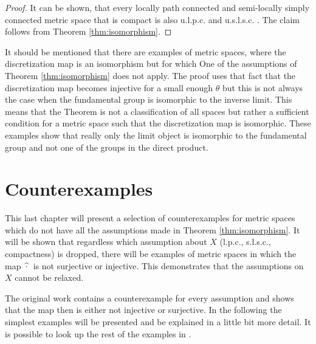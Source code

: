 \documentclass[a4paper, 11pt, twoside]{article}
\theoremstyle{break}
\theoremstyle{break}
\begin{document}
\begin{proof}
  It can be shown, that every locally path connected and semi-locally simply connected metric space that is compact is also u.l.p.c. and u.s.l.s.c. \cite[Lemma 5.14.4]{sakai2013geometric}. The claim follows from Theorem \ref{thm:isomorphism}.
\end{proof}

It should be mentioned that there are examples of metric spaces, where the discretization map is an isomorphism but for which One of the assumptions of Theorem \ref{thm:isomorphism} does not apply.
The proof uses that fact that the discretization map becomes injective for a small enough $\theta$ but this is not always the case when the fundamental group is isomorphic to the inverse limit.
This means that the Theorem is not a classification of all spaces but rather a sufficient condition for a metric space such that the discretization map is isomorphic.
These examples show that really only the limit object is isomorphic to the fundamental group and not one of the groups in the direct product.

\section{Counterexamples}

This last chapter will present a selection of counterexamples for metric spaces which do not have all the assumptions made in Theorem \ref{thm:isomorphism}.
It will be shown that regardless which assumption about $X$ (l.p.c., s.l.s.c., compactness) is dropped, 
there will be examples of metric spaces in which the map $\hspace*{2px}\widehat{\cdot}\hspace*{2px}$ is not surjective or injective.
This demonstrates that the assumptions on $X$ cannot be relaxed.

The original work contains a counterexample for every assumption and shows that the map then is either not injective or surjective. 
In the following the simplest examples will be presented and be explained in a little bit more detail. It is possible to look up the rest of the examples in \cite[p. 8ff]{vigolo2018fundamental}. 
\end{document}
